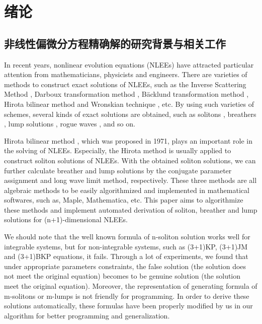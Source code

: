 \chapter{绪论} 
\section{非线性偏微分方程精确解的研究背景与相关工作}
In recent years, nonlinear evolution equations (NLEEs) have attracted particular attention from mathematicians, physicists and engineers. There are varieties of methods to construct exact solutions of NLEEs, such as the Inverse Scattering Method \cite{kawata1978inverse,ma2014verifying}, Darboux transformation method \cite{matveev1991darboux,ling2018general,lou1997non}, B{\"a}cklund transformation method \cite{wahlquist1973backlund,li2008method,cheng2015multiple}, Hirota bilinear method \cite{hirota1971exact,hereman1991exact,hu2002application,hirota2003vector,ma2015lump} and Wronskian technique \cite{freeman1983soliton,ito1988reduce,wu2008n}, etc. By using such varieties of schemes, several kinds of exact solutions are obtained, such as solitons \cite{hirota1971exact,makhankov1980computer}, breathers \cite{tajiri1989breather,guo2011rogue,sun2018general}, lump solutions \cite{satsuma1979two,villarroel1999discrete,imai1997dromion}, rogue waves \cite{guo2011rogue,zhang2014rogue,sun2018general,zhaqilao2018symbolic}, and so on.

Hirota bilinear method \cite{hirota1971exact}, which was proposed in 1971, plays an important role in the solving of NLEEs. Especially, the Hirota method is usually applied to construct soliton solutions of NLEEs. With the obtained soliton solutions, we can further calculate breather and lump solutions by the conjugate parameter assignment \cite{tajiri1989breather} and long wave limit \cite{satsuma1979two} method, respectively. These three methods are all algebraic methods to be easily algorithmized and implemented in mathematical softwares, such as, Maple, Mathematica, etc. This paper aims to algorithmize these methods and  implement automated derivation of soliton, breather and lump solutions for (n+1)-dimensional NLEEs.


We should note that the well known formula of n-soliton solution works well for integrable systems, but for non-integrable systems, such as (3+1)KP\CITEcaKP, (3+1)JM\CITEcaJM{} and (3+1)BKP\CITEcaBKP{} equations, it fails. Through a lot of experiments, we found that under appropriate parameters constraints, the false solution (the solution does not meet the original equation) becomes to be genuine solution (the solution meet the original equation). Moreover, the representation of generating formula of m-solitons or m-lumps is not friendly for programming. In order to derive these solutions automatically, these formulas have been properly modified by us in our algorithm for better programming and generalization.

